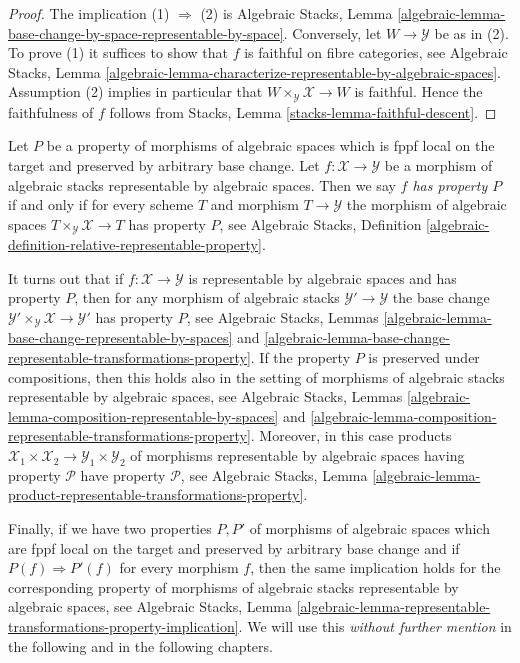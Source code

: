 \begin{proof}
The implication (1) $\Rightarrow$ (2) is
Algebraic Stacks,
Lemma \ref{algebraic-lemma-base-change-by-space-representable-by-space}.
Conversely, let $W \to \mathcal{Y}$ be as in (2). To prove (1) it
suffices to show that $f$ is faithful on fibre categories, see
Algebraic Stacks,
Lemma \ref{algebraic-lemma-characterize-representable-by-algebraic-spaces}.
Assumption (2) implies in particular that
$W \times_\mathcal{Y} \mathcal{X} \to W$ is faithful.
Hence the faithfulness of $f$ follows from
Stacks, Lemma \ref{stacks-lemma-faithful-descent}.
\end{proof}

\noindent
Let $P$ be a property of morphisms of algebraic spaces which is
fppf local on the target and preserved by arbitrary base change.
Let $f : \mathcal{X} \to \mathcal{Y}$ be a morphism of algebraic stacks
representable by algebraic spaces. Then we say
{\it $f$ has property $P$} if and only if for every scheme $T$
and morphism $T \to \mathcal{Y}$ the morphism of algebraic spaces
$T \times_\mathcal{Y} \mathcal{X} \to T$ has property $P$, see
Algebraic Stacks,
Definition \ref{algebraic-definition-relative-representable-property}.

\medskip\noindent
It turns out that if $f : \mathcal{X} \to \mathcal{Y}$ is representable
by algebraic spaces and has property $P$, then for any morphism of algebraic
stacks $\mathcal{Y}' \to \mathcal{Y}$ the base change
$\mathcal{Y}' \times_\mathcal{Y} \mathcal{X} \to \mathcal{Y}'$
has property $P$, see
Algebraic Stacks,
Lemmas \ref{algebraic-lemma-base-change-representable-by-spaces} and
\ref{algebraic-lemma-base-change-representable-transformations-property}.
If the property $P$ is preserved under compositions, then this holds
also in the setting of morphisms of algebraic stacks representable by
algebraic spaces, see
Algebraic Stacks,
Lemmas \ref{algebraic-lemma-composition-representable-by-spaces} and
\ref{algebraic-lemma-composition-representable-transformations-property}.
Moreover, in this case products
$\mathcal{X}_1 \times \mathcal{X}_2 \to \mathcal{Y}_1 \times \mathcal{Y}_2$
of morphisms representable by algebraic spaces having property $\mathcal{P}$
have property $\mathcal{P}$, see
Algebraic Stacks, Lemma
\ref{algebraic-lemma-product-representable-transformations-property}.

\medskip\noindent
Finally, if we have two properties $P, P'$ of morphisms of algebraic spaces
which are fppf local on the target and preserved by arbitrary base change
and if $P(f) \Rightarrow P'(f)$ for every morphism $f$, then the same
implication holds for the corresponding property of morphisms of algebraic
stacks representable by algebraic spaces, see
Algebraic Stacks, Lemma
\ref{algebraic-lemma-representable-transformations-property-implication}.
We will use this {\it without further mention} in the following and in the
following chapters.

